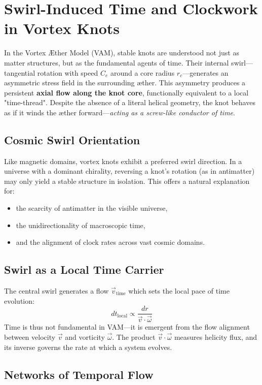 \section{Swirl-Induced Time and Clockwork in Vortex Knots}

In the Vortex Æther Model (VAM), stable knots are understood not just as matter structures, but as the fundamental agents of time. Their internal swirl—tangential rotation with speed \( C_e \) around a core radius \( r_c \)—generates an asymmetric stress field in the surrounding æther. This asymmetry produces a persistent \textbf{axial flow along the knot core}, functionally equivalent to a local "time-thread". Despite the absence of a literal helical geometry, the knot behaves as if it winds the æther forward—\textit{acting as a screw-like conductor of time}.

\subsection*{Cosmic Swirl Orientation}

Like magnetic domains, vortex knots exhibit a preferred swirl direction. In a universe with a dominant chirality, reversing a knot's rotation (as in antimatter) may only yield a stable structure in isolation. This offers a natural explanation for:
\begin{itemize}
    \item the scarcity of antimatter in the visible universe,
    \item the unidirectionality of macroscopic time,
    \item and the alignment of clock rates across vast cosmic domains.
\end{itemize}

\subsection*{Swirl as a Local Time Carrier}

The central swirl generates a flow \( \vec{v}_\text{time} \) which sets the local pace of time evolution:
\[
    dt_{\text{local}} \propto \frac{dr}{\vec{v} \cdot \vec{\omega}}
\]
Time is thus not fundamental in VAM—it is emergent from the flow alignment between velocity \( \vec{v} \) and vorticity \( \vec{\omega} \). The product \( \vec{v} \cdot \vec{\omega} \) measures helicity flux, and its inverse governs the rate at which a system evolves.

\subsection*{Networks of Temporal Flow}

